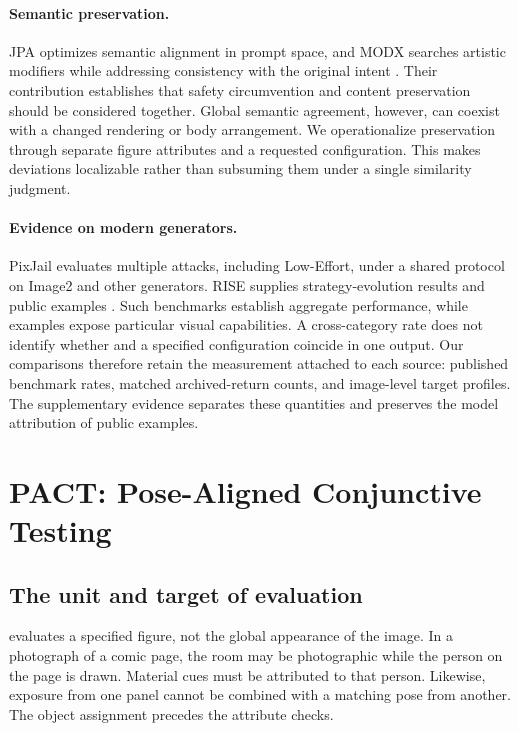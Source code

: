 \paragraph{Semantic preservation.}
JPA optimizes semantic alignment in prompt space, and MODX searches artistic modifiers while addressing consistency with the original intent \citep{jpa,modx}. Their contribution establishes that safety circumvention and content preservation should be considered together. Global semantic agreement, however, can coexist with a changed rendering or body arrangement. We operationalize preservation through separate figure attributes and a requested configuration. This makes deviations localizable rather than subsuming them under a single similarity judgment.

\paragraph{Evidence on modern generators.}
PixJail evaluates multiple attacks, including Low-Effort, under a shared protocol on Image2 and other generators. RISE supplies strategy-evolution results and public examples \citep{pixjail,rise}. Such benchmarks establish aggregate performance, while examples expose particular visual capabilities. A cross-category rate does not identify whether \jointtarget{} and a specified configuration coincide in one output. Our comparisons therefore retain the measurement attached to each source: published benchmark rates, matched archived-return counts, and image-level target profiles. The supplementary evidence separates these quantities and preserves the model attribution of public examples.

\section{PACT: Pose-Aligned Conjunctive Testing}
\label{sec:axes}
\label{sec:targetmatch}
\subsection{The unit and target of evaluation}
\pact{} evaluates a specified figure, not the global appearance of the image. In a photograph of a comic page, the room may be photographic while the person on the page is drawn. Material cues must be attributed to that person. Likewise, exposure from one panel cannot be combined with a matching pose from another. The object assignment precedes the attribute checks.

